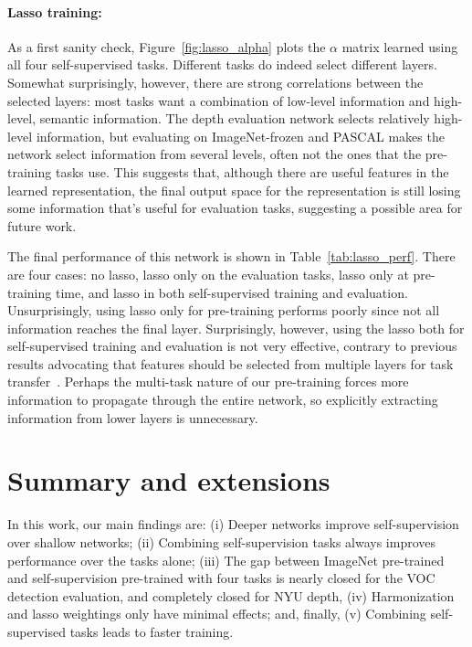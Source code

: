 \documentclass[10pt,twocolumn,letterpaper]{article}
\begin{document}
\paragraph{Lasso training:} As a first sanity check, Figure~\ref{fig:lasso_alpha} plots the $\alpha$ matrix learned using all four self-supervised tasks.  
Different tasks do indeed select different layers.
Somewhat surprisingly, however, there are strong correlations between the selected layers: most tasks want a combination of low-level information and high-level, semantic information.
The depth evaluation network selects
relatively high-level information, but evaluating on ImageNet-frozen
and PASCAL makes the network select information from several levels, often not the ones that the pre-training tasks use.  
This suggests that, although there are useful features in the learned representation, the final output space for the representation is still losing some information that's useful for evaluation tasks, suggesting a possible area for future work.

The final
performance of this network is shown in Table~\ref{tab:lasso_perf}. There 
are four cases: no lasso, lasso only on the evaluation tasks, lasso only at pre-training time, and lasso
in both self-supervised training and evaluation.
Unsurprisingly, using lasso only for pre-training performs poorly since not all information reaches the final layer.
Surprisingly, however, using the lasso both for self-supervised training and evaluation is not very effective, contrary to previous results advocating that features should be selected from multiple layers for task transfer~\cite{misra2016cross,hariharan2015hypercolumns,rusu2016progressive}.
Perhaps the multi-task nature of our pre-training forces more information to propagate through the entire network, so explicitly extracting information from lower layers is unnecessary.


\section{Summary and extensions}

\label{sec:conclusion}
In this work, our main findings are: (i) 
Deeper networks improve self-supervision over shallow networks; (ii)
Combining self-supervision tasks always improves performance over the tasks alone; (iii)
The gap between ImageNet pre-trained and self-supervision pre-trained with four tasks is nearly 
closed for the VOC detection evaluation, and completely closed for NYU depth, (iv)
Harmonization and lasso weightings only have minimal effects; and, finally,
(v) Combining self-supervised tasks leads to faster training.
\end{document}
